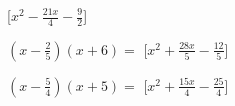 \begin{esercizio}
\begin{multicols}{2}
\begin{enumeratea}
  \hfill [\(x^{2} - \frac{21 x}{4} - \frac{9}{2}\)]
\item \(\left(x - \frac{2}{5}\right)\left(x + 6\right)=\)
  \hfill [\(x^{2} + \frac{28 x}{5} - \frac{12}{5}\)]
\item \(\left(x - \frac{5}{4}\right)\left(x + 5\right)=\)
  \hfill [\(x^{2} + \frac{15 x}{4} - \frac{25}{4}\)]
\end{enumeratea}
\end{multicols}
\end{esercizio}


